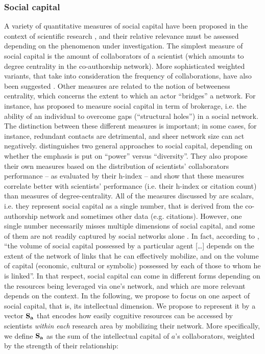 \documentclass{article}
\begin{document}
\subsubsection{Social capital}

A variety of quantitative measures of social capital have been proposed in the context of scientific research \citep{Abbasi2014,Schirone2023}, and their relative relevance must be assessed depending on the phenomenon under investigation. The simplest measure of social capital is the amount of collaborators of a scientist (which amounts to degree centrality in the co-authorship network). More sophisticated weighted variants, that take into consideration the frequency of collaborations, have also been suggested \citep{Abbasi2014}. Other measures are related to the notion of betweeness centrality, which concerns the extent to which an actor ``bridges'' a network. For instance, \citet{BurtBrokerage2007} has proposed to measure social capital in term of brokerage, i.e. the ability of an individual to overcome gaps (``structural holes'') in a social network. The distinction between these different measures is important; in some cases, for instance, redundant contacts are detrimental, and sheer network size can act negatively. \citet{Abbasi2014} distinguishes two general approaches to social capital, depending on whether the emphasis is put on ``power'' versus ``diversity''. They also propose their own measures based on the distribution of scientists' collaborators performance -- as evaluated by their h-index -- and show that these measures correlate better with scientists' performance (i.e. their h-index or citation count) than measures of degree-centrality. All of the measures discussed by \citet{Abbasi2014} are scalars, i.e. they represent social capital as a single number, that is derived from the co-authorship network and sometimes other data (e.g. citations). However, one single number necessarily misses multiple dimensions of social capital, and some of them are not readily captured by social networks alone \citep{MartnAlczar2019}. In fact, according to \citet{Bourdieu1980}, ``the volume of social capital possessed by a particular agent [\dots] depends on the extent of the network of links that he can effectively mobilize, and on the volume of capital (economic, cultural or symbolic) possessed by each of those to whom he is linked''. In that respect, social capital can come in different forms depending on the resources being leveraged via one's network, and which are more relevant depends on the context. In the following, we propose to focus on one aspect of social capital, that is, its intellectual dimension. We propose to represent it by a vector $\bf{S}_{a}$ that encodes how easily cognitive resources can be accessed by scientists \textit{within each} research area by mobilizing their network. %
More specifically, we define $\bf{S}_{a}$ as the sum of the intellectual capital of $a$'s collaborators, weighted by the strength of their relationship:
\end{document}
